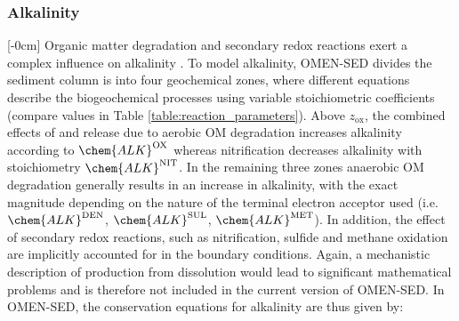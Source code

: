 \documentclass[gmd, manuscript]{copernicus}
\begin{document}
\subsubsection{Alkalinity}\label{subsubsec:ALK}
[-0cm]%
Organic matter degradation and secondary redox reactions exert a complex influence on alkalinity  \citep[e.g.][]{jourabchi_quantitative_2005, wolf-gladrow_total_2007, krumins_dissolved_2013}. 
To model alkalinity, OMEN-SED divides the sediment column is into four geochemical zones, 
where different equations describe the biogeochemical processes using variable stoichiometric coefficients (compare values in Table \ref{table:reaction_parameters}). 
Above $z_{\mathrm{ox}}$, the combined effects of  and  release due to aerobic OM degradation increases alkalinity according to $\chem{ALK}^\mathrm{OX}$ whereas nitrification decreases alkalinity with stoichiometry 
$\chem{ALK}^\mathrm{NIT}$. 
In the remaining three zones anaerobic OM degradation generally results in an increase in alkalinity, with the exact magnitude depending on the nature of the terminal electron acceptor used 
(i.e. $\chem{ALK}^\mathrm{DEN}$, $\chem{ALK}^\mathrm{SUL}$, $\chem{ALK}^\mathrm{MET}$). In addition, the effect of secondary redox reactions, such as nitrification, sulfide and methane oxidation are implicitly accounted for in the boundary conditions. 
Again, a mechanistic description of  production from  dissolution %
would lead to significant mathematical problems and is therefore not included in the current version of OMEN-SED. 
In OMEN-SED, the conservation equations for alkalinity are thus given by:
\end{document}
